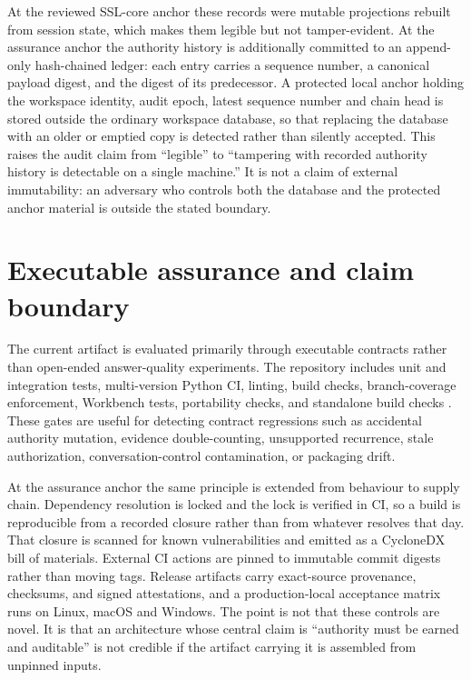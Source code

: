 \documentclass[11pt]{article}
\begin{document}
At the reviewed SSL-core anchor these records were mutable projections rebuilt from session state, which makes them legible but not tamper-evident. At the assurance anchor the authority history is additionally committed to an append-only hash-chained ledger: each entry carries a sequence number, a canonical payload digest, and the digest of its predecessor. A protected local anchor holding the workspace identity, audit epoch, latest sequence number and chain head is stored outside the ordinary workspace database, so that replacing the database with an older or emptied copy is detected rather than silently accepted. This raises the audit claim from ``legible'' to ``tampering with recorded authority history is detectable on a single machine.'' It is not a claim of external immutability: an adversary who controls both the database and the protected anchor material is outside the stated boundary.

\section{Executable assurance and claim boundary}
\label{sec:evaluation}

The current artifact is evaluated primarily through executable contracts rather than open-ended answer-quality experiments. The repository includes unit and integration tests, multi-version Python CI, linting, build checks, branch-coverage enforcement, Workbench tests, portability checks, and standalone build checks \citep{shadowseed2026}. These gates are useful for detecting contract regressions such as accidental authority mutation, evidence double-counting, unsupported recurrence, stale authorization, conversation-control contamination, or packaging drift.

At the assurance anchor the same principle is extended from behaviour to supply chain. Dependency resolution is locked and the lock is verified in CI, so a build is reproducible from a recorded closure rather than from whatever resolves that day. That closure is scanned for known vulnerabilities and emitted as a CycloneDX bill of materials. External CI actions are pinned to immutable commit digests rather than moving tags. Release artifacts carry exact-source provenance, checksums, and signed attestations, and a production-local acceptance matrix runs on Linux, macOS and Windows. The point is not that these controls are novel. It is that an architecture whose central claim is ``authority must be earned and auditable'' is not credible if the artifact carrying it is assembled from unpinned inputs.
\end{document}
